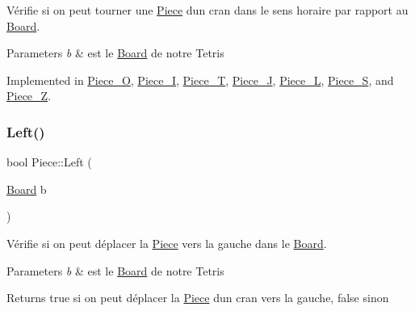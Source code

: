 Vérifie si on peut tourner une \hyperlink{classPiece}{Piece} d\textquotesingle{}un cran dans le sens horaire par rapport au \hyperlink{classBoard}{Board}. 


\begin{DoxyParams}{Parameters}
{\em b} & est le \hyperlink{classBoard}{Board} de notre Tetris \\
\hline
\end{DoxyParams}


Implemented in \hyperlink{classPiece__O_af82900ecec4e7bd058d43825293d8bff}{Piece\+\_\+O}, \hyperlink{classPiece__I_aec103ce64d2702bf3dc5dbcdb8b450eb}{Piece\+\_\+I}, \hyperlink{classPiece__T_a64088f0140b870d178169e36460cd4de}{Piece\+\_\+T}, \hyperlink{classPiece__J_aee0abd6254be3a50a86ff5464bb459f8}{Piece\+\_\+J}, \hyperlink{classPiece__L_a34954ce32a27bdadb4d56ca7f3d82cba}{Piece\+\_\+L}, \hyperlink{classPiece__S_a725b9e7b154628e035bcc7ebd2a3ec9f}{Piece\+\_\+S}, and \hyperlink{classPiece__Z_aa70256d6f49dacad685a15c5ae8df06d}{Piece\+\_\+Z}.

\mbox{\label{classPiece_aaef48eb5277927bcacace16aaf2d9636}} 
\subsubsection{\texorpdfstring{Left()}{Left()}}
{\footnotesize\ttfamily bool Piece\+::\+Left (\begin{DoxyParamCaption}\item[{\hyperlink{classBoard}{Board}}]{b }\end{DoxyParamCaption})}



Vérifie si on peut déplacer la \hyperlink{classPiece}{Piece} vers la gauche dans le \hyperlink{classBoard}{Board}. 


\begin{DoxyParams}{Parameters}
{\em b} & est le \hyperlink{classBoard}{Board} de notre Tetris \\
\hline
\end{DoxyParams}
\begin{DoxyReturn}{Returns}
true si on peut déplacer la \hyperlink{classPiece}{Piece} d\textquotesingle{}un cran vers la gauche, false sinon 
\end{DoxyReturn}
\mbox{\label{classPiece_a44530e200e9506f7bb4668e82dd91d54}} 
